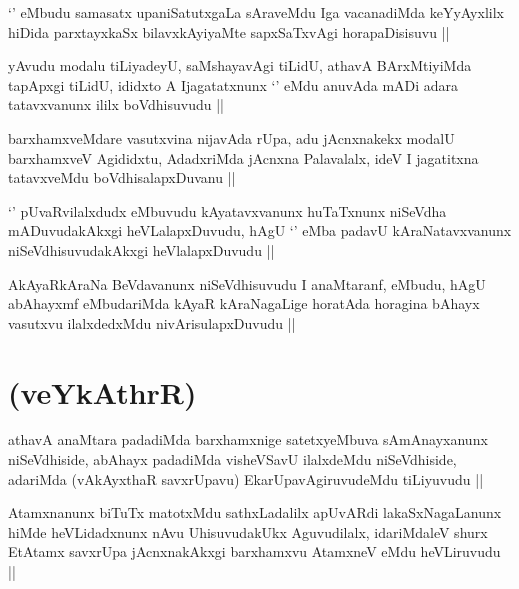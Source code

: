 \begin{artha}
`\stext' eMbudu samasatx upaniSatutxgaLa sAraveMdu Iga vacanadiMda
  keYyAyxlilx hiDida parxtayxkaSx bilavxkAyiyaMte sapxSaTxvAgi
  horapaDisisuvu ||
\end{artha}

\begin{artha}
yAvudu modalu tiLiyadeyU, saMshayavAgi tiLidU, athavA BArxMtiyiMda
tapApxgi tiLidU, ididxto A Ijagatatxnunx `\stext' eMdu anuvAda mADi
adara tatavxvanunx ililx boVdhisuvudu ||
\end{artha}

\begin{artha}
barxhamxveMdare vasutxvina nijavAda rUpa, adu jAcnxnakekx modalU
barxhamxveV Agididxtu, AdadxriMda jAcnxna Palavalalx, ideV I
jagatitxna tatavxveMdu boVdhisalapxDuvanu ||
\end{artha}


\begin{artha}
`\stext' pUvaRvilalxdudx eMbuvudu kAyatavxvanunx huTaTxnunx niSeVdha
  mADuvudakAkxgi heVLalapxDuvudu, hAgU `\stext' eMba padavU
  kAraNatavxvanunx niSeVdhisuvudakAkxgi heVlalapxDuvudu ||
\end{artha}


\begin{artha}
AkAyaRkAraNa BeVdavanunx niSeVdhisuvudu I anaMtaranf, eMbudu, hAgU
abAhayxmf eMbudariMda kAyaR kAraNagaLige horatAda horagina bAhayx
vasutxvu ilalxdedxMdu nivArisulapxDuvudu ||
\end{artha}

\section*{(veYkAthrR)}

\begin{artha}
athavA anaMtara padadiMda barxhamxnige satetxyeMbuva sAmAnayxanunx
niSeVdhiside, abAhayx padadiMda visheVSavU ilalxdeMdu niSeVdhiside,
adariMda (vAkAyxthaR savxrUpavu) EkarUpavAgiruvudeMdu tiLiyuvudu ||
\end{artha}


\begin{artha}
Atamxnanunx biTuTx matotxMdu sathxLadalilx apUvARdi lakaSxNagaLanunx
hiMde heVLidadxnunx nAvu UhisuvudakUkx Aguvudilalx, idariMdaleV shurx
EtAtamx savxrUpa jAcnxnakAkxgi barxhamxvu AtamxneV eMdu heVLiruvudu ||
\end{artha}

